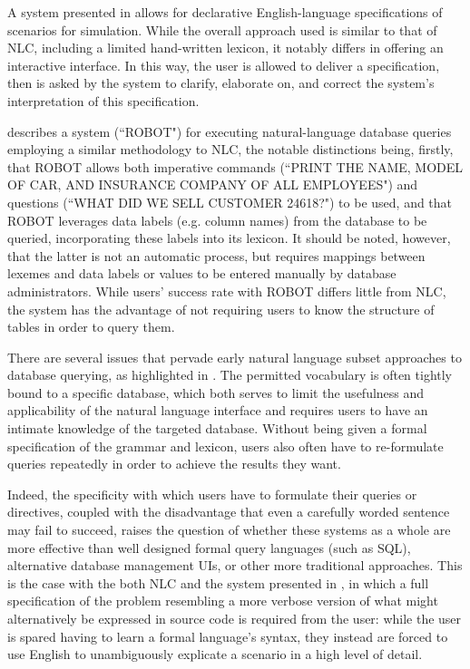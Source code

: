\documentclass[a4paper,11pt]{proposal}
\begin{document}
A system presented in \cite{heidorn1974} allows for declarative English-language specifications of scenarios for simulation. While the overall approach used is similar to that of NLC, including a limited hand-written lexicon, it notably differs in offering an interactive interface. In this way, the user is allowed to deliver a specification, then is asked by the system to clarify, elaborate on, and correct the system's interpretation of this specification.

\cite{harris1977} describes a system (``ROBOT") for executing natural-language database queries employing a similar methodology to NLC, the notable distinctions being, firstly, that ROBOT allows both imperative commands (``PRINT THE NAME, MODEL OF CAR, AND INSURANCE COMPANY OF ALL EMPLOYEES") and questions (``WHAT DID WE SELL CUSTOMER 24618?") to be used, and that ROBOT leverages data labels (e.g. column names) from the database to be queried, incorporating these labels into its lexicon. It should be noted, however, that the latter is not an automatic process, but requires mappings between lexemes and data labels or values to be entered manually by database administrators. While users' success rate with ROBOT differs little from NLC, the system has the advantage of not requiring users to know the structure of tables in order to query them.

There are several issues that pervade early natural language subset approaches to database querying, as highlighted in \cite{capindale1990}. The permitted vocabulary is often tightly bound to a specific database, which both serves to limit the usefulness and applicability of the natural language interface and requires users to have an intimate knowledge of the targeted database. Without being given a formal specification of the grammar and lexicon, users also often have to re-formulate queries repeatedly in order to achieve the results they want. 

Indeed, the specificity with which users have to formulate their queries or directives, coupled with the disadvantage that even a carefully worded sentence may fail to succeed, raises the question of whether these systems as a whole are more effective than well designed formal query languages (such as SQL), alternative database management UIs, or other more traditional approaches. This is the case with the both NLC and the system presented in \cite{heidorn1974}, in which a full specification of the problem resembling a more verbose version of what might alternatively be expressed in source code is required from the user: while the user is spared having to learn a formal language's syntax, they instead are forced to use English to unambiguously explicate a scenario in a high level of detail.
\end{document}
